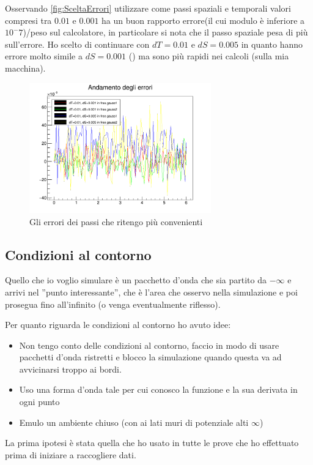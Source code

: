 Osservando \autoref{fig:SceltaErrori} utilizzare come passi spaziali e temporali valori compresi tra $0.01$ e $0.001$ ha un buon rapporto errore(il cui modulo \`e inferiore a $10^-7$)/peso sul calcolatore, in particolare si nota che il passo spaziale pesa di pi\`u sull'errore. Ho scelto di continuare con $dT = 0.01$ e $dS = 0.005$ in quanto hanno errore molto simile a $dS = 0.001$ () ma sono pi\`u rapidi nei calcoli (sulla mia macchina).

\begin{figure}[ht]
\centering
\includegraphics[width=0.7\textwidth]{IMG/sceltaPassi}
\caption[Scelta Passi]{Gli errori dei passi che ritengo pi\`u convenienti}\label{fig:sceltaPassi}
\end{figure}

\subsection{Condizioni al contorno}
Quello che io voglio simulare \`e un pacchetto d'onda che sia partito da $-\infty$ e arrivi nel ''punto interessante'', che \`e l'area che osservo nella simulazione e poi prosegua fino all'infinito (o venga eventualmente riflesso).

Per quanto riguarda le condizioni al contorno ho avuto idee:
\begin{itemize}
	\item Non tengo conto delle condizioni al contorno, faccio in modo di usare pacchetti d'onda ristretti e blocco la simulazione quando questa va ad  avvicinarsi troppo ai bordi.
	\item Uso una forma d'onda tale per cui conosco la funzione e la sua derivata in ogni punto
	\item Emulo un ambiente chiuso (con ai lati muri di potenziale alti $\infty$)
\end{itemize}
La prima ipotesi \`e stata quella che ho usato in tutte le prove che ho effettuato prima di iniziare a raccogliere dati.

